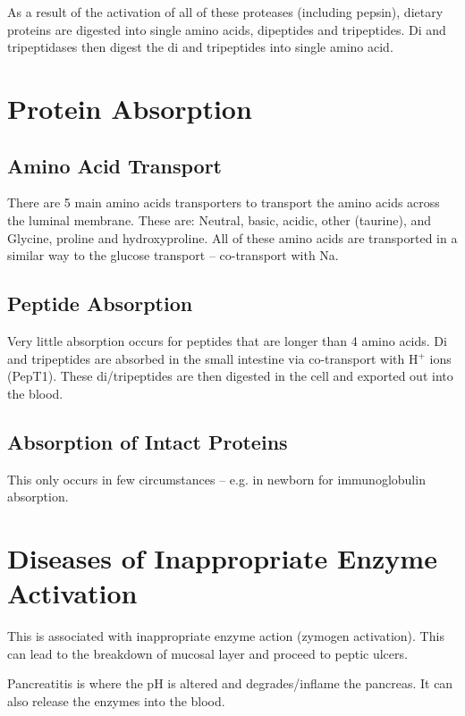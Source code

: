 As a result of the activation of all of these proteases (including pepsin), dietary proteins are digested into single amino acids, dipeptides and tripeptides.
Di and tripeptidases then digest the di and tripeptides into single amino acid.

\section{Protein Absorption}

\subsection{Amino Acid Transport}

There are 5 main amino acids transporters to transport the amino acids across the luminal membrane.
These are: Neutral, basic, acidic, other (taurine), and Glycine, proline and hydroxyproline.
All of these amino acids are transported in a similar way to the glucose transport -- co-transport with Na.

\subsection{Peptide Absorption}

Very little absorption occurs for peptides that are longer than 4 amino acids.
Di and tripeptides are absorbed in the small intestine via co-transport with H$^+$ ions (PepT1).
These di/tripeptides are then digested in the cell and exported out into the blood.

\subsection{Absorption of Intact Proteins}

This only occurs in few circumstances -- e.g. in newborn for immunoglobulin absorption.

\section{Diseases of Inappropriate Enzyme Activation}

This is associated with inappropriate enzyme action (zymogen activation).
This can lead to the breakdown of mucosal layer and proceed to peptic ulcers.

Pancreatitis is where the pH is altered and degrades/inflame the pancreas.
It can also release the enzymes into the blood.

